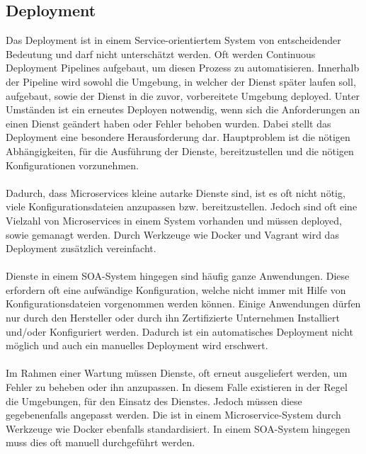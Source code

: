 \subsection{Deployment}
\label{subsec:Deployment}
Das Deployment ist in einem Service-orientiertem System von entscheidender Bedeutung und darf nicht unterschätzt werden. Oft werden Continuous Deployment Pipelines aufgebaut, um diesen Prozess zu automatisieren. Innerhalb der Pipeline wird sowohl die Umgebung, in welcher der Dienst später laufen soll, aufgebaut, sowie der Dienst in die zuvor, vorbereitete Umgebung deployed. Unter Umständen ist ein erneutes Deployen notwendig, wenn sich die Anforderungen an einen Dienst geändert haben oder Fehler behoben wurden. Dabei stellt das Deployment eine besondere Herausforderung dar. Hauptproblem ist die nötigen Abhängigkeiten, für die Ausführung der Dienste, bereitzustellen und die nötigen Konfigurationen vorzunehmen.
\\\\
Dadurch, dass Microservices kleine autarke Dienste sind, ist es oft nicht nötig, viele Konfigurationsdateien anzupassen bzw. bereitzustellen. Jedoch sind oft eine Vielzahl von Microservices in einem System vorhanden und müssen deployed, sowie gemanagt werden. Durch Werkzeuge wie Docker und Vagrant wird das Deployment zusätzlich vereinfacht. 
\\\\
Dienste in einem SOA-System hingegen sind häufig ganze Anwendungen. Diese erfordern oft eine aufwändige Konfiguration, welche nicht immer mit Hilfe von Konfigurationsdateien vorgenommen werden können. Einige Anwendungen dürfen nur durch den Hersteller oder durch ihn Zertifizierte Unternehmen Installiert und/oder Konfiguriert werden. Dadurch ist ein automatisches Deployment nicht möglich und auch ein manuelles Deployment wird erschwert.
\\\\
Im Rahmen einer Wartung müssen Dienste, oft erneut ausgeliefert werden, um Fehler zu beheben oder ihn anzupassen. In diesem Falle existieren in der Regel die Umgebungen, für den Einsatz des Dienstes. Jedoch müssen diese gegebenenfalls angepasst werden. Die ist in einem Microservice-System durch Werkzeuge wie Docker ebenfalls standardisiert. In einem SOA-System hingegen muss dies oft manuell durchgeführt werden.

